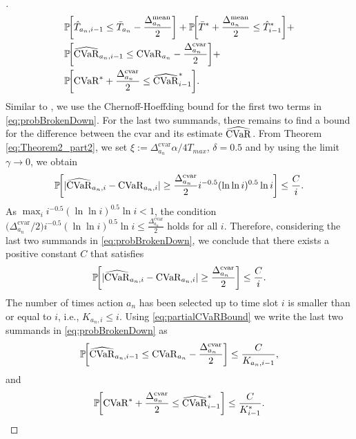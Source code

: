 \begin{proof}[\unskip\nopunct]
{\begin{align}
     & \mathbb{P}\!\left[\hat{T}_{a_n,i-1} \leq \bar{T}_{a_n} - \frac{\Delta^\mathrm{mean}_{a_n}}{2}\right] + \mathbb{P}\!\left[\bar{T}^* + \frac{\Delta^\mathrm{mean}_{a_n}}{2} \leq \hat{T}^*_{i-1}\right] + \nonumber \\
    &\mathbb{P}\!\left[\estcvar{a_n,i-1} \leq \cvar{a_n} - \frac{\Delta^\mathrm{cvar}_{a_n}}{2}\right]+ \nonumber \\
    & \mathbb{P}\!\left[\cvar{}^* + \frac{\Delta^\mathrm{cvar}_{a_n}}{2} \leq \estcvar{i-1}^*\right]. \label{eq:probBrokenDown}
\end{align}
}
Similar to \cite{Auer2002}, we use the Chernoff-Hoeffding bound for the first two terms in \eqref{eq:probBrokenDown}. For the last two  summands, there remains to find a bound for the difference between the \gls{cvar} and its estimate ${\widehat{\mathrm{CVaR}}}_{}$. 
From Theorem \ref{eq:Theorem2_part2}, we set $\xi := {\Delta^\mathrm{cvar}_{a_n} \alpha}/{4 T_{max}}$, $\delta=0.5$ and by using the limit $\gamma \rightarrow 0$, we obtain
{\small
\begin{equation}
\begin{gathered}
    \mathbb{P}\!\left[|\estcvar{a_n,i}-\cvar{a_n,i}|\geq \frac{\Delta^\mathrm{cvar}_{a_n}}{2}i^{-0.5}(\ln{\ln{i}})^{0.5}\ln{i}\right] \leq \frac{C}{i}.
\end{gathered}
\end{equation}
}
As $\max_i i^{-0.5}(\ln{\ln{i}})^{0.5}\ln{i} < 1$, the condition ${(\Delta^\mathrm{cvar}_{a_n}}/{2})i^{-0.5}(\ln{\ln{i}})^{0.5}\ln{i} \leq \frac{\Delta^\mathrm{cvar}_{a_n}}{2}$
holds for all $i$. Therefore, considering the last two summands in \eqref{eq:probBrokenDown}, we conclude that there exists a positive constant $C$ that satisfies
{\small
\begin{equation}
\mathbb{P}\!\left[|\estcvar{a_n,i}-\cvar{a_n,i}|\geq \frac{\Delta^\mathrm{cvar}_{a_n}}{2}\right] \leq \frac{C}{i}.
\label{eq:partialCVaRBound}
\end{equation}}
The number of times action $a_n$ has been selected up to time slot $i$ is smaller than or equal to $i$, i.e., $K_{a_n,i}\leq i$. Using \eqref{eq:partialCVaRBound} we write the last two summands in \eqref{eq:probBrokenDown} as 
{\small
\begin{align}
    \mathbb{P}\!\left[\estcvar{a_n,i-1} \leq \cvar{a_n} - \frac{\Delta^\mathrm{cvar}_{a_n}}{2} \right] \leq \frac{C}{K_{a_n,i-1}},
\end{align}}
and
{\small
\begin{align}
    \mathbb{P}\!\left[\cvar{}^* + \frac{\Delta^\mathrm{cvar}_{a_n}}{2} \leq \estcvar{i-1}^*\right] \leq \frac{C}{K^*_{i-1}}.

\end{align}}
\end{proof}
